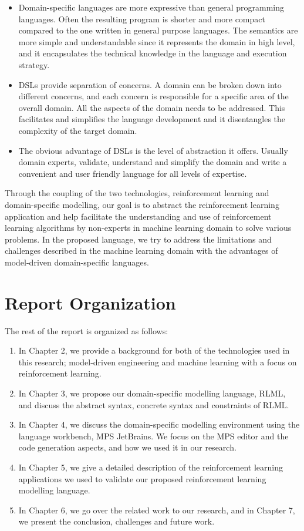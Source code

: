 \documentclass[11pt,letterpaper]{ryersonSGSThesis}
\begin{document}
\begin{ryersonSGSThesis}
        \begin{itemize}
            \item Domain-specific languages are more expressive than general programming languages. Often the resulting program is shorter and more compact compared to the one written in general purpose languages. The semantics are more simple and understandable since it represents the domain in high level, and it encapsulates the technical knowledge in the language and execution strategy.
            \item DSLs provide separation of concerns. A domain can be broken down into different concerns, and each concern is responsible for a specific area of the overall domain. All the aspects of the domain needs to be addressed. This facilitates and simplifies the language development and it disentangles the complexity of the target domain.
            \item The obvious advantage of DSLs is the level of abstraction it offers. Usually domain experts, validate, understand and simplify the domain and write a convenient and user friendly language for all levels of expertise.
        \end{itemize}

        Through the coupling of the two technologies, reinforcement learning and domain-specific modelling, our goal is to abstract the reinforcement learning application and help facilitate the understanding and use of reinforcement learning algorithms by non-experts in machine learning domain to solve various problems. In the proposed language, we try to address the limitations and challenges described in the machine learning domain with the advantages of model-driven domain-specific languages. 

    \section{Report Organization}
        The rest of the report is organized as follows:
        \begin{enumerate}
          \item In Chapter 2, we provide a background for both of the technologies used in this research; model-driven engineering and machine learning with a focus on reinforcement learning.
          \item In Chapter 3, we propose our domain-specific modelling language, RLML, and discuss the abstract syntax, concrete syntax and constraints of RLML.
          \item In Chapter 4, we discuss the domain-specific modelling environment using the language workbench, MPS JetBrains. We focus on the MPS editor and the code generation aspects, and how we used it in our research.
          \item In Chapter 5, we give a detailed description of the reinforcement learning applications we used to validate our proposed reinforcement learning modelling language.
          \item In Chapter 6, we go over the related work to our research, and in Chapter 7, we present the conclusion, challenges and future work.
        \end{enumerate}


\end{ryersonSGSThesis}
\end{document}

